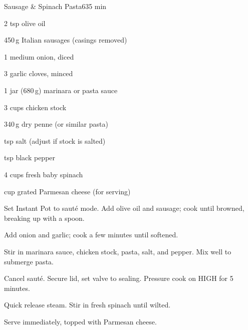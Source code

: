 \begin{recipebox}{Sausage \& Spinach Pasta}{6}{35 min}
  \begin{ingredients}
    \item 2 tsp olive oil
    \item 450\,g Italian sausages (casings removed)
    \item 1 medium onion, diced
    \item 3 garlic cloves, minced
    \item 1 jar (680\,g) marinara or pasta sauce
    \item 3 cups chicken stock
    \item 340\,g dry penne (or similar pasta)
    \item {} tsp salt (adjust if stock is salted)
    \item {} tsp black pepper
    \item 4 cups fresh baby spinach
    \item {} cup grated Parmesan cheese (for serving)
  \end{ingredients}

  \begin{method}
    \item Set Instant Pot to sauté mode. Add olive oil and sausage; cook until browned, breaking up with a spoon.
    \item Add onion and garlic; cook a few minutes until softened.
    \item Stir in marinara sauce, chicken stock, pasta, salt, and pepper. Mix well to submerge pasta.
    \item Cancel sauté. Secure lid, set valve to sealing. Pressure cook on HIGH for 5 minutes.
    \item Quick release steam. Stir in fresh spinach until wilted.
    \item Serve immediately, topped with Parmesan cheese.
  \end{method}
\end{recipebox}